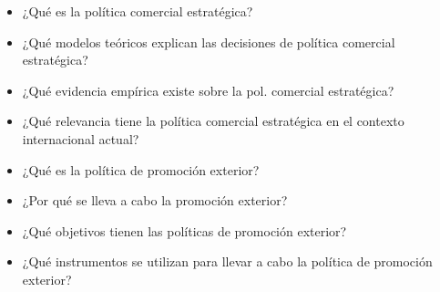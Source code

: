 \documentclass{nuevotema}
\begin{document}
\ideaclave

\begin{itemize}
	\item ¿Qué es la política comercial estratégica?
	\item ¿Qué modelos teóricos explican las decisiones de política comercial estratégica?
	\item ¿Qué evidencia empírica existe sobre la pol. comercial estratégica?
	\item ¿Qué relevancia tiene la política comercial estratégica en el contexto internacional actual?
	\item ¿Qué es la política de promoción exterior?
	\item ¿Por qué se lleva a cabo la promoción exterior?
	\item ¿Qué objetivos tienen las políticas de promoción exterior?
	\item ¿Qué instrumentos se utilizan para llevar a cabo la política de promoción exterior?
\end{itemize}


\esquemacorto
\end{document}
